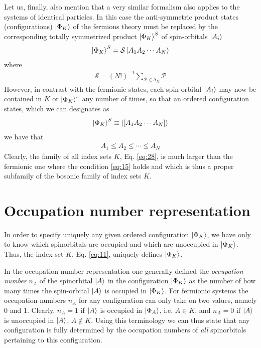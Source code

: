 \documentclass{book}
\renewcommand{\ket}[1]{\Ket{#1}}
\begin{document}
Let us, finally, also mention that a very similar formalism also applies to the systems of identical particles. In this case the anti-symmetric product states (configurations) $\ket{\Phi_K}$ of the fermions theory must be replaced by the corresponding totally symmetrized product $\ket{\Phi_K}^S$ of spin-orbitals $\ket{A_i}$ 
\begin{align}
    \ket{\Phi_K}^S = \mathcal{S} \ket{A_1A_2\cdots A_N}
    \label{eq:25}
\end{align}
where
\begin{align}
    \mathcal{S} = (N!)^{-1} \sum_{\mathcal{P}\in \mathcal{S}_N}\mathcal{P}
\end{align}
However, in contrast with the fermionic states, each spin-orbital $\ket{A_i}$ may now be contained in $K$ or $\ket{\Phi_K}^s$ any number of times, so that an ordered configuration states, which we can designates as 
\begin{align}
    \ket{\Phi_K}^S \equiv \ket{[A_1A_2\cdots A_N]}
\end{align}
we have that
\begin{align}
    A_1\leqslant A_2\leqslant \cdots\leqslant  A_N
    \label{eq:28}
\end{align}
Clearly, the family of all index sets $K$, Eq. \eqref{eq:28}, is much larger than the fermionic one where the condition \eqref{eq:15} holds and which is thus a proper subfamily of the bosonic family of index sets $K$.

\section{Occupation number representation}
In order to specify uniquely any given ordered configuration $\ket{\Phi_K}$, we have only to know which spinorbitals are occupied and which are unoccupied in $\ket{\Phi_K}$. Thus, the index set $K$, Eq. \eqref{eq:11}, uniquely defines $\ket{\Phi_K}$.

In the occupation number representation one generally defined the \emph{occupation number} $n_A$ of the spinorbital $\ket{A}$ in the configuration $\ket{\Phi_K}$ as the number of how many times the spin-orbital $\ket{A}$ is occupied in $\ket{\Phi_K}$. For fermionic systems the occupation numbers $n_A$ for any configuration can only take on two values, namely 0 and 1. Clearly, $n_A=1$ if $\ket{A}$ is occupied in $\ket{\Phi_A}$, i.e. $A\in K$, and $n_A=0$ if $\ket{A}$ is unoccupied in $\ket{A}$, $A\notin K$. Using this terminology we can thus state that any configuration is fully determined by the occupation numbers of \emph{all} spinorbitals pertaining to this configuration.
\end{document}
